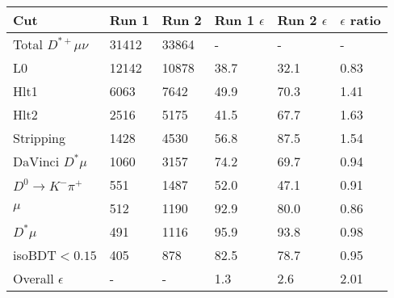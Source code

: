 \begin{tabular}{llllll}
\toprule
 Cut                       & Run 1   & Run 2   & Run 1 $\epsilon$   & Run 2 $\epsilon$   & $\epsilon$ ratio   \\
\midrule
 Total $D^{*+}\mu\nu$      & 31412   & 33864   & -                  & -                  & -                  \\
 L0                        & 12142   & 10878   & 38.7               & 32.1               & 0.83               \\
 Hlt1                      & 6063    & 7642    & 49.9               & 70.3               & 1.41               \\
 Hlt2                      & 2516    & 5175    & 41.5               & 67.7               & 1.63               \\
 Stripping                 & 1428    & 4530    & 56.8               & 87.5               & 1.54               \\
 DaVinci $D^* \mu$         & 1060    & 3157    & 74.2               & 69.7               & 0.94               \\
 $D^0\rightarrow K^-\pi^+$ & 551     & 1487    & 52.0               & 47.1               & 0.91               \\
 $\mu$                     & 512     & 1190    & 92.9               & 80.0               & 0.86               \\
 $D^* \mu$                 & 491     & 1116    & 95.9               & 93.8               & 0.98               \\
 isoBDT$ < 0.15$           & 405     & 878     & 82.5               & 78.7               & 0.95               \\
 Overall $\epsilon$        & -       & -       & 1.3                & 2.6                & 2.01               \\
\bottomrule
\end{tabular}
